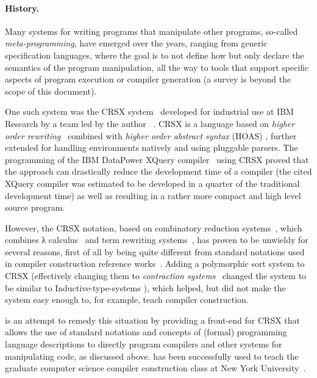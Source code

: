 \documentclass[11pt]{article} %
\begin{document}
\paragraph*{History.}

Many systems for writing programs that manipulate other programs, so-called \emph{meta-programming},
have emerged over the years, ranging from generic specification languages, where the goal is to not
define how but only declare the semantics of the program manipulation, all the way to tools that
support specific aspects of program execution or compiler generation (a survey is beyond the scope
of this document).

One such system was the CRSX system~\cite{Rose:1996} developed for industrial use at IBM Research by
a team led by the author~\cite{Rose:hor2007,Rose:hor2010,Rose:rta2011,crsx} .  CRSX is a language
based on \emph{higher order rewriting}~\cite{Jouannaud:klop2005} combined with \emph{higher order
  abstract syntax} (HOAS) \cite{PfenningElliot:pldi1988}, further extended for handling environments
natively and using pluggable parsers.  The programming of the IBM Data\-Power XQuery
compiler~\cite{dp60:ibm2013} using CRSX proved that the approach can drastically reduce the
development time of a compiler (the cited XQuery compiler was estimated to be developed in a quarter
of the traditional development time) as well as resulting in a rather more compact and high level
source program.

However, the CRSX notation, based on combinatory reduction systems~\cite{Klop:1980,Klop+:tcs1993},
which combines λ calculus~\cite{Church:1941,Barendregt:1984} and term rewriting
systems~\cite{Klop:1992:Handbook}, has proven to be unwieldy for several reasons, first of all by
being quite different from standard notations used in compiler construction reference
works~\cite{Aho+:2006}. Adding a polymorphic sort system to CRSX (effectively changing them to
\emph{contraction systems}~\cite{Aczel:1978} changed the system to be similar to
Inductive-type-systems \cite{BlanquiJouannaudOkada:tcs2002}), which helped, but did not make the
system easy enough to, for example, teach compiler construction.

\HAX is an attempt to remedy this situation by providing a front-end for CRSX that allows the use of
standard notations and concepts of (formal) programming language descriptions to directly program
compilers and other systems for manipulating code, as discussed above. \HAX has been successfully
used to teach the graduate computer science compiler construction class at New York
University~\cite{RoseRose:cims2015}.
\end{document}
